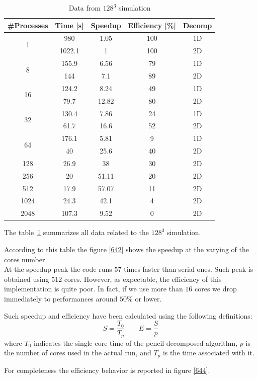 \begin{table}[h]
\caption{Data from $128^{3}$ simulation}
\begin{center}
\begin{tabular}{c c c c c}
\toprule
\textbf{\#Processes} & \textbf{Time [s]} & \textbf{Speedup} & \textbf{Efficiency [\%]} & \textbf{Decomp}\\
\midrule
\multirow{2}{*}{1} & 980 & 1.05 & 100 & 1D\\
& 1022.1 & 1 & 100 & 2D \\
\hline
\multirow{2}{*}{8} & 155.9 & 6.56 & 79 & 1D\\
& 144 & 7.1 & 89 & 2D\\
\hline
\multirow{2}{*}{16} & 124.2 & 8.24 & 49 & 1D\\
& 79.7 & 12.82 & 80 & 2D\\
\hline
\multirow{2}{*}{32} & 130.4 & 7.86 & 24 & 1D\\
& 61.7 & 16.6 & 52 & 2D\\
\hline
\multirow{2}{*}{64} & 176.1 & 5.81 & 9 & 1D\\
& 40 & 25.6 & 40 & 2D\\
\hline
128 & 26.9 & 38 & 30 & 2D\\

256 & 20 & 51.11 & 20 & 2D\\

512 & 17.9 & 57.07 & 11 & 2D\\

1024 & 24.3 & 42.1 & 4 & 2D\\

2048 & 107.3 & 9.52 & 0 & 2D\\
\bottomrule
\end{tabular}
\end{center}
\label{64data}
\end{table}%


The table~\ref{64data} summarizes all data related to the $128^{3}$ simulation. 


\par
According to this table the figure \ref{642} shows the speedup at the varying of the cores number. \\
At the speedup peak the code runs $57$ times faster than serial ones. Such peak is obtained using $512$ cores. However, as expectable, the efficiency of this implementation is quite poor. In fact, if we use more than $16$ cores we drop immediately to performances around $50\%$ or lower. 
\par
Such speedup and efficiency have been calculated using the following definitions:
\[
S = \frac{T_{0}}{T_{p}} \quad \quad E = \frac{S}{p}
\]
where $T_{0}$ indicates the single core time of the pencil decomposed algorithm, $p$ is the number of cores used in the actual run, and $T_{p}$ is the time associated with it. \\
\par
For completeness the efficiency behavior is reported in figure \ref{644}.

